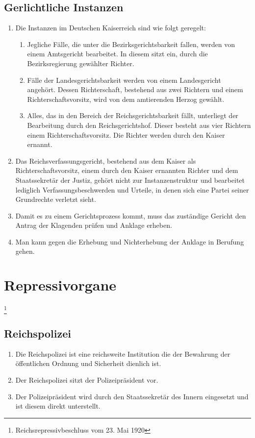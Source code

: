 \documentclass{article}
\begin{document}
\subsection{Gerlichtliche Instanzen}
\begin{enumerate}[(1)]
    \item Die Instanzen im Deutschen Kaiserreich sind wie folgt geregelt:
    \begin{enumerate}[1.]
        \item Jegliche Fälle, die unter die Bezirksgerichtsbarkeit fallen, werden von einem Amtsgericht bearbeitet. In diesem sitzt ein, durch die Bezirksregierung gewählter Richter.
        \item Fälle der Landesgerichtsbarkeit werden von einem Landesgericht angehört. Dessen Richterschaft, bestehend aus zwei Richtern und einem Richterschaftsvorsitz, wird von dem amtierenden Herzog gewählt.
        \item Alles, das in den Bereich der Reichsgerichtsbarkeit fällt, unterliegt der Bearbeitung durch den Reichsgerichtshof. Dieser besteht aus vier Richtern einem Richterschaftsvorsitz. Die Richter werden durch den Kaiser ernannt.
    \end{enumerate}
    \item Das Reichsverfassungsgericht, bestehend aus dem Kaiser als Richterschaftsvorsitz, einem durch den Kaiser ernannten Richter und dem Staatssekretär der Justiz, gehört nicht zur Instanzenstruktur und
    bearbeitet lediglich Verfassungsbeschwerden und Urteile, in denen sich eine Partei seiner Grundrechte verletzt sieht.
    \item Damit es zu einem Gerichtsprozess kommt, muss das zuständige Gericht den Antrag der Klagenden prüfen und Anklage erheben.
    \item Man kann gegen die Erhebung und Nichterhebung der Anklage in Berufung gehen.
\end{enumerate}

\section{Repressivorgane}\footnote{Reichsrepressivbeschluss vom 23. Mai 1920}
\subsection{Reichspolizei}
\begin{enumerate}[(1)]
    \item Die Reichspolizei ist eine reichsweite Institution die der Bewahrung der öffentlichen Ordnung und Sicherheit dienlich ist.
    \item Der Reichspolizei sitzt der Polizeipräsident vor.
    \item Der Polizeipräsident wird durch den Staatssekretär des Innern eingesetzt und ist diesem direkt unterstellt.
\end{enumerate}
\end{document}

